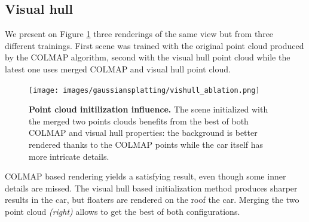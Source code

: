 \subsection{Visual hull} 

We present on Figure \ref{fig:gs-vishull-comp} three renderings of the same view but from three different trainings. First scene was trained with the original point cloud produced by the COLMAP algorithm, second with the visual hull point cloud while the latest one uses merged COLMAP and visual hull point cloud.   

\begin{figure}[htb!]
  \center
\texttt{[image: images/gaussiansplatting/vishull\_ablation.png]}
\caption{\textbf{Point cloud initilization influence.} The scene initialized with the merged two points clouds benefits from the best of both COLMAP and visual hull properties: the background is better rendered thanks to the COLMAP points while the car itself has more intricate details.}
\label{fig:gs-vishull-comp}
\end{figure}

COLMAP based rendering yields a satisfying result, even though some inner details are missed. The visual hull based initialization method produces sharper results in the car, but floaters are rendered on the roof the car. Merging the two point cloud \textit{(right)} allows to get the best of both configurations. 

